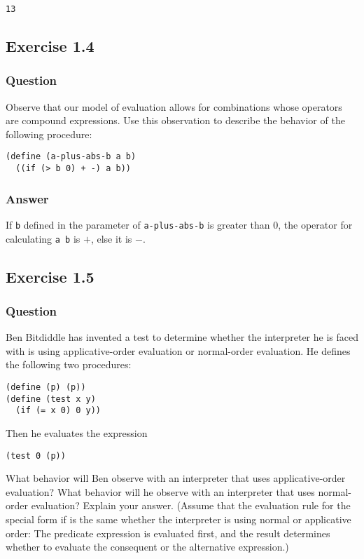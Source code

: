 \documentclass[11pt]{article}
\begin{document}
\begin{verbatim}
13
\end{verbatim}

\subsection{Exercise 1.4}
\label{sec:orgdb9dadc}
\subsubsection{Question}
\label{sec:orgce34547}
Observe that our model of evaluation allows
for combinations whose operators are compound
expressions. Use this observation to describe the behavior of the
following procedure:
\begin{verbatim}
(define (a-plus-abs-b a b)
  ((if (> b 0) + -) a b))
\end{verbatim}

\subsubsection{Answer}
\label{sec:org59d3bef}
If \texttt{b} defined in the parameter of \texttt{a-plus-abs-b} is greater than 0,
the operator for calculating \texttt{a b} is \(+\),
else it is \(-\).

\subsection{Exercise 1.5}
\label{sec:org5f86765}
\subsubsection{Question}
\label{sec:org81a1095}
Ben Bitdiddle has invented a test to determine
whether the interpreter he is faced with is using
applicative-order evaluation or normal-order evaluation. He defines the
following two procedures:
\begin{verbatim}
(define (p) (p))
(define (test x y)
  (if (= x 0) 0 y))
\end{verbatim}
Then he evaluates the expression
\begin{verbatim}
(test 0 (p))
\end{verbatim}
What behavior will Ben observe with an interpreter that
uses applicative-order evaluation? What behavior will he
observe with an interpreter that uses normal-order
evaluation? Explain your answer. (Assume that the evaluation
rule for the special form if is the same whether the
interpreter is using normal or applicative order: The
predicate expression is evaluated first, and the result determines
whether to evaluate the consequent or the alternative
expression.)
\end{document}
